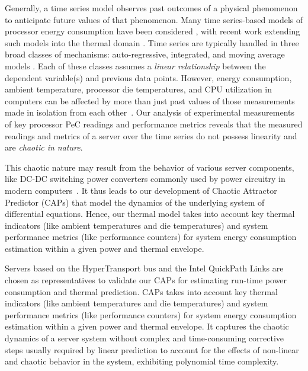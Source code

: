Generally, a time series model observes past outcomes of a physical
phenomenon to anticipate future values of that phenomenon.  Many time
series-based models of processor energy consumption have been considered
\cite{Rivoire2008a,Bhattacharjee2009,Powell2009,Reich2010,Bircher2011},
with recent work extending such models into the thermal domain
\cite{Coskun2008}.  Time series are typically handled in three broad
classes of mechanisms: auto-regressive, integrated, and moving average
models \cite{Box1994}.  Each of these classes assumes a \textit{linear
  relationship} between the dependent variable(s) and previous data
points. However, energy consumption, ambient temperature, processor die
temperatures, and CPU utilization in computers can be affected by more
than just past values of those measurements made in isolation from each
other~\cite{Bertran2010,McCullough2011}.  Our analysis of experimental
measurements of key processor PeC readings and performance metrics
reveals that the measured readings and metrics of a server over the time
series do not possess linearity and are \textit{chaotic in nature}.

This chaotic nature may result from the behavior of various server
components, like DC-DC switching power converters commonly used by power
circuitry in modern computers~\cite{Hamill1997,Tse2002}.  It thus leads
to our development of Chaotic Attractor Predictor (CAPs) that model
the dynamics of the underlying system of differential equations. Hence,
our thermal model takes into account key thermal indicators (like ambient
temperatures and die temperatures) and system performance metrics (like
performance counters) for system energy consumption estimation within a
given power and thermal envelope.  

Servers based on the HyperTransport bus \cite{HT2008} and the Intel
QuickPath Links \cite{Intel2009} are chosen as representatives to
validate our CAPs for estimating run-time power consumption and thermal
prediction.  CAPs takes into account key thermal indicators (like
ambient temperatures and die temperatures) and system performance
metrics (like performance counters) for system energy consumption
estimation within a given power and thermal envelope. It captures the
chaotic dynamics of a server system without complex and time-consuming
corrective steps usually required by linear prediction to account for
the effects of non-linear and chaotic behavior in the system, exhibiting
polynomial time complexity.  

